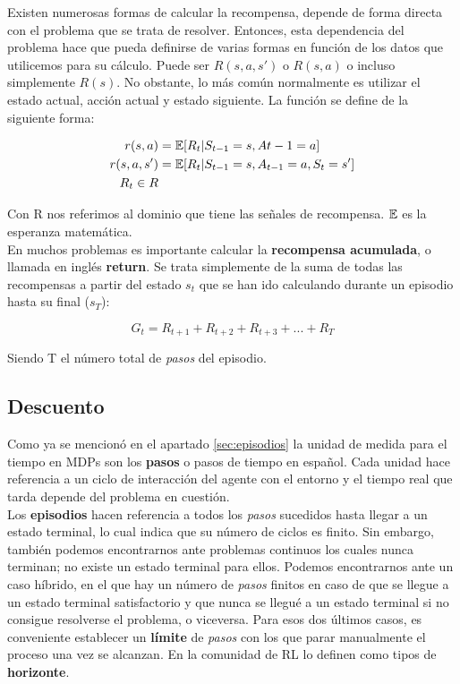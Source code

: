 \documentclass[11pt,fleqn]{book} %
\begin{document}
Existen numerosas formas de calcular la recompensa, depende de forma directa con el problema que se trata de resolver. Entonces, esta dependencia del problema hace que pueda definirse de varias formas en función de los datos que utilicemos para su cálculo. Puede ser $R(s,a,s')$ o $R(s,a)$ o incluso simplemente $R(s)$. No obstante, lo más común normalmente es utilizar el estado actual, acción actual y estado siguiente. La función se define de la siguiente forma:

\begin{align}
\begin{split}
r(s,a)&=\mathbb{E}[R_t|S_{t-1}=s,A{t-1}=a]\\
r(s,a,s')&=\mathbb{E}[R_t|S_{t-1}=s,A_{t-1}=a,S_t=s']\\
R_t \in R
\end{split}
\end{align}

Con R nos referimos al dominio que tiene las señales de recompensa. $\mathbb{E}$ es la esperanza matemática.\\

En muchos problemas es importante calcular la \textbf{recompensa acumulada}, o llamada en inglés \textbf{return}. Se trata simplemente de la suma de todas las recompensas a partir del estado $s_t$ que se han ido calculando durante un episodio hasta su final ($s_T$):

\begin{equation}
G_t=R_{t+1}+R_{t+2}+R_{t+3}+...+R_T
\end{equation}

Siendo T el número total de \textit{pasos} del episodio.

\subsection{Descuento}

Como ya se mencionó en el apartado \ref{sec:episodios} la unidad de medida para el tiempo en MDPs son los \textbf{pasos} o pasos de tiempo en español. Cada unidad hace referencia a un ciclo de interacción del agente con el entorno y el tiempo real que tarda depende del problema en cuestión. \\

Los \textbf{episodios} hacen referencia a todos los \textit{pasos} sucedidos hasta llegar a un estado terminal, lo cual indica que su número de ciclos es finito. Sin embargo, también podemos encontrarnos ante problemas continuos los cuales nunca terminan; no existe un estado terminal para ellos. Podemos encontrarnos ante un caso híbrido, en el que hay un número de \textit{pasos} finitos en caso de que se llegue a un estado terminal satisfactorio y que nunca se llegué a un estado terminal si no consigue resolverse el problema, o viceversa. Para esos dos últimos casos, es conveniente establecer un \textbf{límite} de \textit{pasos} con los que parar manualmente el proceso una vez se alcanzan. En la comunidad de RL lo definen como tipos de \textbf{horizonte}.\\
\end{document}
